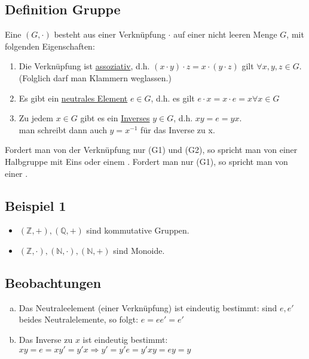 \subsection{Definition Gruppe}
\label{sub: gef_gruppe}
Eine  $(G,\cdot )$ besteht aus einer Verknüpfung $\cdot $ auf einer nicht leeren Menge $G$, mit folgenden Eigenschaften:
\begin{enumerate}[(G1)]
	\item Die Verknüpfung ist \uline{assoziativ}, d.h. $(x\cdot y)\cdot z = x \cdot (y \cdot z)$ gilt $\forall x,y,z \in G$.\\ 
	(Folglich darf man Klammern weglassen.)
	\item Es gibt ein \uline{neutrales Element} $e \in G$, d.h. es gilt $e\cdot x= x\cdot e= x \forall x\in G$
	\item Zu jedem $x\in G$ gibt es ein \uline{Inverses} $y \in G$, d.h. $xy=e=yx.$\\
	man schreibt dann auch $y=x^{-1}$ für das Inverse zu x.
\end{enumerate}
Fordert man von der Verknüpfung nur (G1) und (G2), so spricht man von einer Halbgruppe mit Eins oder einem . Fordert man nur (G1), so spricht man von einer .\\

\subsection{Beispiel 1}
\label{sub:beispiel_1}
\begin{itemize}
	\item $(\mathds{Z}, +), (\mathds{Q}, +)$ sind kommutative Gruppen.
	\item $(\mathds{Z},\cdot), (\mathds{N},\cdot), (\mathds{N}, +)$ sind Monoide.
\end{itemize}

\subsection{Beobachtungen}
\label{sub: beobachtungen}
\begin{enumerate}[a)]
	\item Das Neutraleelement (einer Verknüpfung) ist eindeutig bestimmt: sind $e,e'$ beides Neutralelemente, so folgt: $e=ee'=e'$
	\item Das Inverse zu $x$ ist eindeutig bestimmt:\\
	$xy=e=xy'=y'x \Rightarrow y'=y'e=y'xy=ey=y$
\end{enumerate}

